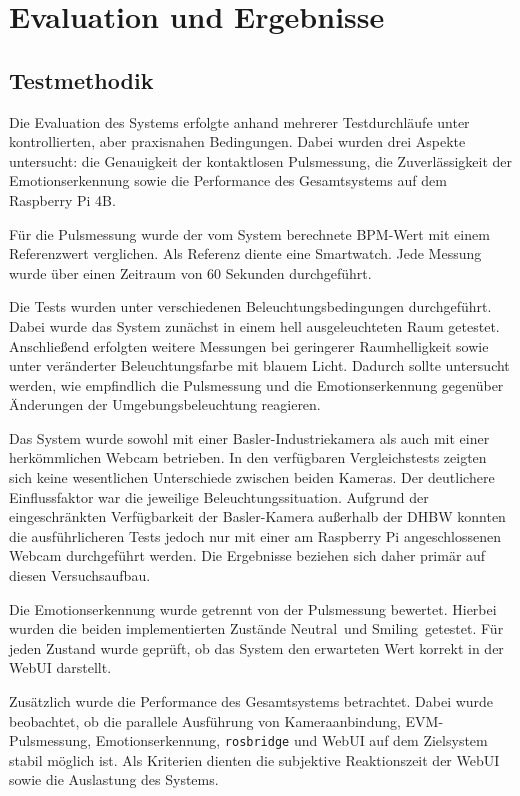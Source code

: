 \chapter{Evaluation und Ergebnisse}

\section{Testmethodik}

Die Evaluation des Systems erfolgte anhand mehrerer Testdurchläufe unter kontrollierten, aber praxisnahen Bedingungen. Dabei wurden drei Aspekte untersucht: die Genauigkeit der kontaktlosen Pulsmessung, die Zuverlässigkeit der Emotionserkennung sowie die Performance des Gesamtsystems auf dem Raspberry Pi 4B.

Für die Pulsmessung wurde der vom System berechnete BPM-Wert mit einem Referenzwert verglichen. Als Referenz diente eine Smartwatch. Jede Messung wurde über einen Zeitraum von 60 Sekunden durchgeführt.

Die Tests wurden unter verschiedenen Beleuchtungsbedingungen durchgeführt. Dabei wurde das System zunächst in einem hell ausgeleuchteten Raum getestet. Anschließend erfolgten weitere Messungen bei geringerer Raumhelligkeit sowie unter veränderter Beleuchtungsfarbe mit blauem Licht. Dadurch sollte untersucht werden, wie empfindlich die Pulsmessung und die Emotionserkennung gegenüber Änderungen der Umgebungsbeleuchtung reagieren.

Das System wurde sowohl mit einer Basler-Industriekamera als auch mit einer herkömmlichen Webcam betrieben. In den verfügbaren Vergleichstests zeigten sich keine wesentlichen Unterschiede zwischen beiden Kameras. Der deutlichere Einflussfaktor war die jeweilige Beleuchtungssituation. Aufgrund der eingeschränkten Verfügbarkeit der Basler-Kamera außerhalb der DHBW konnten die ausführlicheren Tests jedoch nur mit einer am Raspberry Pi angeschlossenen Webcam durchgeführt werden. Die Ergebnisse beziehen sich daher primär auf diesen Versuchsaufbau.

Die Emotionserkennung wurde getrennt von der Pulsmessung bewertet. Hierbei wurden die beiden implementierten Zustände \glqq Neutral\grqq\ und \glqq Smiling\grqq\ getestet. Für jeden Zustand wurde geprüft, ob das System den erwarteten Wert korrekt in der WebUI darstellt.

Zusätzlich wurde die Performance des Gesamtsystems betrachtet. Dabei wurde beobachtet, ob die parallele Ausführung von Kameraanbindung, EVM-Pulsmessung, Emotionserkennung, \texttt{rosbridge} und WebUI auf dem Zielsystem stabil möglich ist. Als Kriterien dienten die subjektive Reaktionszeit der WebUI sowie die Auslastung des Systems.

